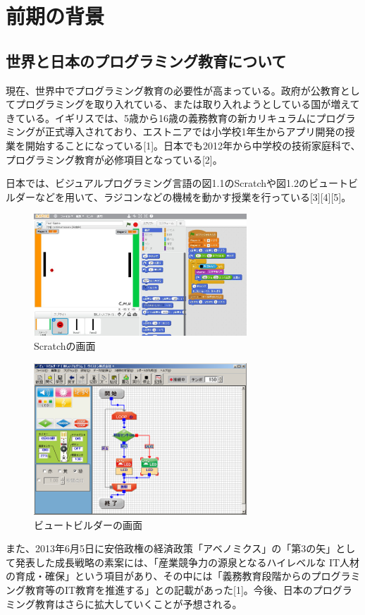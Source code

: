 \documentclass[openany,11pt,papersize]{jsbook}
\begin{document}
\tableofcontents%


\mainmatter%

\chapter{前期の背景}
\section{世界と日本のプログラミング教育について}
現在、世界中でプログラミング教育の必要性が高まっている。政府が公教育としてプログラミングを取り入れている、または取り入れようとしている国が増えてきている。イギリスでは、5歳から16歳の義務教育の新カリキュラムにプログラミングが正式導入されており、エストニアでは小学校1年生からアプリ開発の授業を開始することになっている[1]。日本でも2012年から中学校の技術家庭科で、プログラミング教育が必修項目となっている[2]。

日本では、ビジュアルプログラミング言語の図1.1のScratchや図1.2のビュートビルダーなどを用いて、ラジコンなどの機械を動かす授業を行っている[3][4][5]。
\begin{figure}[H]
\begin{center}
\includegraphics[width=8cm, bb=0 0 1306 780]{img/Scratch.jpg}
\end{center}
\caption{Scratchの画面}
\end{figure}



\begin{figure}[H]
\begin{center}
\includegraphics[width=8cm, bb=0 0 1006 770]{img/BeautoBuilderP_SSs.png}
\end{center}
\caption{ビュートビルダーの画面}
\end{figure}
また、2013年6月5日に安倍政権の経済政策「アベノミクス」の「第3の矢」として発表した成長戦略の素案には、「産業競争力の源泉となるハイレベルな IT人材の育成・確保」という項目があり、その中には「義務教育段階からのプログラミング教育等のIT教育を推進する」との記載があった[1]。今後、日本のプログラミング教育はさらに拡大していくことが予想される。
\end{document}
